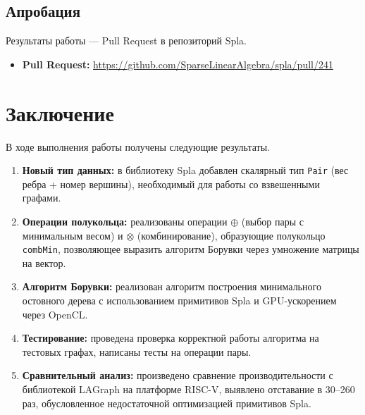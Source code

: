 \documentclass[a4paper]{article}
\begin{document}
\subsection{Апробация}

Результаты работы --- Pull Request в репозиторий Spla.
\begin{itemize}
    \item \textbf{Pull Request:} \url{https://github.com/SparseLinearAlgebra/spla/pull/241}
\end{itemize}
\section{Заключение}

В ходе выполнения работы получены следующие результаты.

\begin{enumerate}
    \item \textbf{Новый тип данных:} в библиотеку Spla добавлен скалярный тип \texttt{Pair} (вес ребра + номер вершины), необходимый для работы со взвешенными графами.
    
    \item \textbf{Операции полукольца:} реализованы операции $\oplus$ (выбор пары с минимальным весом) и $\otimes$ (комбинирование), образующие полукольцо \texttt{combMin}, позволяющее выразить алгоритм Борувки через умножение матрицы на вектор.
    
    \item \textbf{Алгоритм Борувки:} реализован алгоритм построения минимального остовного дерева с использованием примитивов Spla и GPU-ускорением через OpenCL.
    
    \item \textbf{Тестирование:} проведена проверка корректной работы алгоритма на тестовых графах, написаны тесты на операции пары.
    
    \item \textbf{Сравнительный анализ:} произведено сравнение производительности с библиотекой LAGraph на платформе RISC-V, выявлено отставание в 30–260 раз, обусловленное недостаточной оптимизацией примитивов Spla.
\end{enumerate}
\end{document}
